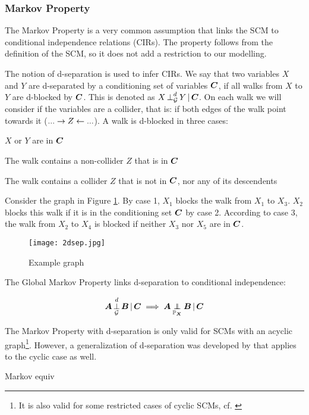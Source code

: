 \subsubsection{Markov Property}
The Markov Property is a very common assumption that links the SCM to conditional independence relations (CIRs). The property follows from the definition of the SCM, so it does not add a restriction to our modelling. 

The notion of d-separation is used to infer CIRs. We say that two variables $X$ and $Y$ are d-separated by a conditioning set of variables $\B{C}$, if all walks from $X$ to $Y$ are d-blocked by $\B{C}$. This is denoted as $\dsep{X}{Y}{\B{C}}{\C{G}}$. On each walk we will consider if the variables are a collider, that is: if both edges of the walk point towards it ($...\to Z \ot ...$). A walk is d-blocked in three cases:

\begin{compactenum}
    \item $X$ or $Y$ are in $\B{C}$
    \item The walk contains a non-collider $Z$ that is in $\B{C}$
    \item The walk contains a collider $Z$ that is not in $\B{C}$, nor any of its descendents
\end{compactenum}

Consider the graph in Figure \ref{fig:2:dsep}. By case 1, $X_1$ blocks the walk from $X_1$ to $X_3$. $X_2$ blocks this walk if it is in the conditioning set $\B{C}$ by case 2. According to case 3, the walk from $X_2$ to $X_4$ is blocked if neither $X_3$ nor $X_5$ are in $\B{C}$.

\begin{figure}[h]
    \centering
    \texttt{[image: 2dsep.jpg]}
    \caption{Example graph}
    \label{fig:2:dsep}
\end{figure}

The Global Markov Property links d-separation to conditional independence:

$$\dsep{\B{A}}{\B{B}}{\B{C}}{\C{G}} \implies \indep{\B{A}}{\B{B}}{\B{C}}{\Prb_{\B{X}}}$$

The Markov Property with d-separation is only valid for SCMs with an acyclic graph\footnote{It is also valid for some restricted cases of cyclic SCMs, cf. \citet{forre2017markov}}. However, a generalization of d-separation was developed by \citet{forre2017markov} that applies to the cyclic case as well.

Markov equiv


